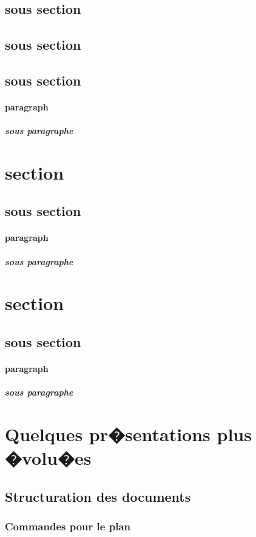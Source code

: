 \documentclass{article}
\begin{document}
\subsection{sous section}
\subsection{sous section}
\subsection{sous section}
\paragraph{paragraph}
\subparagraph{sous paragraphe}

\section{section}
\subsection{sous section}
\paragraph{paragraph}
\subparagraph{sous paragraphe}

\section{section}
\subsection{sous section}
\paragraph{paragraph}
\subparagraph{sous paragraphe}

\section{Quelques pr�sentations plus �volu�es}
\subsection{Structuration des documents}
\subsubsection{Commandes pour le plan}
\end{document}

